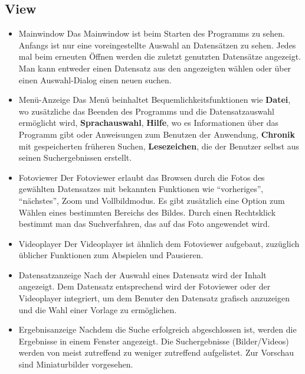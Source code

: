 \subsection{View}
\begin{itemize}
\item Mainwindow \newline
Das Mainwindow ist beim Starten des Programms zu sehen. Anfangs ist nur eine voreingestellte Auswahl an Datensätzen zu sehen. Jedes mal beim erneuten Öffnen werden die zuletzt genutzten Datensätze angezeigt. Man kann entweder einen Datensatz aus den angezeigten wählen oder über einen Auswahl-Dialog einen neuen suchen.
\item Menü-Anzeige \newline
Das Menü beinhaltet Bequemlichkeitsfunktionen wie \textbf{Datei}, wo zusätzliche das Beenden des Programms und die Datensatzauswahl ermöglicht wird, \textbf{Sprachauswahl}, \textbf{Hilfe}, wo es Informationen über das Programm gibt oder Anweisungen zum Benutzen der Anwendung, \textbf{Chronik} mit gespeicherten früheren Suchen, \textbf{Lesezeichen}, die der Benutzer selbst aus seinen Suchergebnissen erstellt.
\item Fotoviewer \newline
Der Fotoviewer erlaubt das Browsen durch die Fotos des gewählten Datensatzes mit bekannten Funktionen wie \enquote{vorheriges}, \enquote{nächstes}, Zoom und Vollbildmodus. Es gibt zusätzlich eine Option zum Wählen eines bestimmten Bereichs des Bildes. Durch einen Rechtsklick bestimmt man das Suchverfahren, das auf das Foto angewendet wird.
\item Videoplayer \newline
Der Videoplayer ist ähnlich dem Fotoviewer aufgebaut, zuzüglich üblicher Funktionen zum Abspielen und Pausieren.
\item Datensatzanzeige \newline
Nach der Auswahl eines Datensatz wird der Inhalt angezeigt. Dem Datensatz entsprechend wird der Fotoviewer oder der Videoplayer integriert, um dem Benuter den Datensatz grafisch anzuzeigen und die Wahl einer Vorlage zu ermöglichen.
\item Ergebnisanzeige \newline
Nachdem die Suche erfolgreich abgeschlossen ist, werden die Ergebnisse in einem Fenster angezeigt. Die Suchergebnisse (Bilder/Videos) werden von meist zutreffend zu weniger zutreffend aufgelistet. Zur Vorschau sind Miniaturbilder vorgesehen.
\end{itemize}
